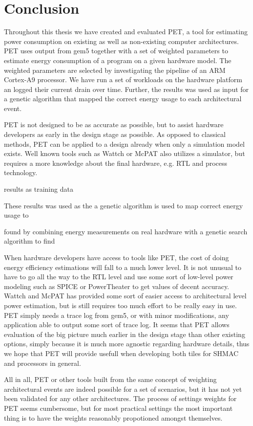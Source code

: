 \section{Conclusion}

Throughout this thesis we have created and evaluated PET, a tool for estimating
power consumption on existing as well as non-existing computer architectures.
PET uses output from gem5 together with a set of weighted parameters to estimate
energy consumption of a program on a given hardware model. The weighted
parameters are selected by investigating the pipeline of an ARM Cortex-A9
processor. We have run a set of workloads on the hardware platform an logged
their current drain over time. Further, the results was used as input for a
genetic algorithm that mapped the correct energy usage to each architectural
event.

PET is not designed to be as accurate as possible, but to assist hardware
developers as early in the design stage as possible. As opposed to classical
methods, PET can be applied to a design already when only a simulation model
exists. Well known tools such as Wattch or McPAT also utilizes a simulator, but
requires a more knowledge about the final hardware, e.g. RTL and process
technology.


  results as training data

These results was
used as the 
a genetic algorithm is used to map correct energy usage to 


  found by combining energy measurements on real hardware with a genetic
search algorithm to find 
















When hardware developers have access to tools like PET, the cost of doing energy
efficiency estimations will fall to a much lower level. It is not unusual to
have to go all the way to the RTL level and use some sort of low-level power
modeling such as SPICE \cite{ponomarev2002accupower} or PowerTheater
\cite{bruno2005rtl} to get values of decent accuracy. Wattch and McPAT has
provided some sort of easier access to architectural level power estimation, but
is still requires too much effort to be really easy in use. PET simply needs a
trace log from gem5, or with minor modifications, any application able to output
some sort of trace log. It seems that PET allows evaluation of the big picture much
earlier in the design stage than other existing options, simply because it is much
more agnostic regarding hardware details, thus we hope that PET will provide usefull
when developing both tiles for SHMAC and processors in general.

All in all, PET or other tools built from the same concept of weighting architectural
events are indeed possible for a set of scenarios, but it has not yet been validated for
any other architectures. The process of settings weights for PET seems cumbersome, but
for most practical settings the most important thing is to have the weights reasonably
propotioned amongst themselves.
